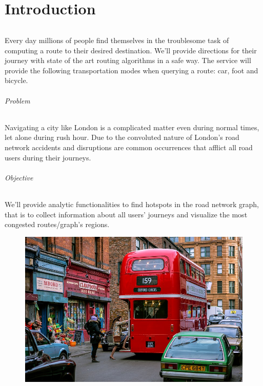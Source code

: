 \part{Introduction}

\paragraph{}
Every day millions of people find themselves in the troublesome task of 
computing a route to their desired destination. We'll provide directions for 
their journey with state of the art routing algorithms in a safe way. The 
service will provide the following transportation modes when querying a route: 
car, foot and bicycle.

\paragraph{Problem}
Navigating a city like London is a complicated matter even during normal times, 
let alone during rush hour. Due to the convoluted nature of London’s road 
network accidents and disruptions are common occurrences that afflict all road 
users during their journeys.

\paragraph{Objective}
We’ll provide analytic functionalities to find hotspots in the road network 
graph, that is to collect information about all users' journeys and visualize 
the most congested routes/graph’s regions.

\begin{figure}[H]
	\centering
	\includegraphics[width=0.9\linewidth]{assets/londontraffic.jpg}
\end{figure}


